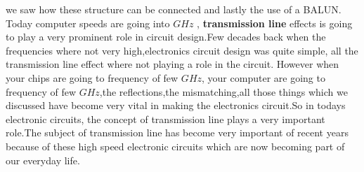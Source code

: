 we saw how these structure can be connected and lastly the use of a BALUN.\\
Today computer speeds are going into $GHz$ , \textbf{transmission line }effects is going to play a very prominent role in circuit design.Few decades back when the frequencies where not very high,electronics circuit design was quite simple, all the transmission line effect where not playing a role in the circuit. However when your chips are going to frequency of few $GHz$, your computer are going to frequency of few $GHz$,the reflections,the mismatching,all those things which we discussed have become very vital in making the electronics circuit.So in todays electronic circuits, the concept of transmission line plays a very  important role.The subject of transmission line has become very important of recent years because of these high speed electronic circuits which are now becoming part of our everyday life. 